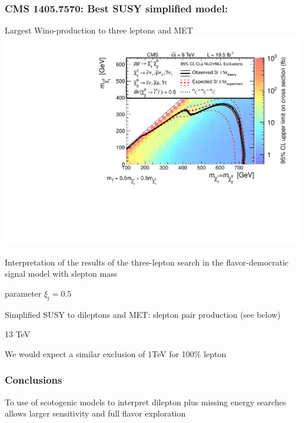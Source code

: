 \documentclass[%
xcolor=dvipsnames,table%
]{beamer}
\begin{document}
\begin{frame}
  \frametitle{CMS 1405.7570: Best SUSY simplified model:}
  Largest Wino-production to three leptons and MET
\centering
\includegraphics[scale=0.4,angle=-90]{exclusion_TChiSlepSnu_2i_0_5}

\begin{tiny}
Interpretation of the results of the three-lepton search in the flavor-democratic signal
model with slepton mass\\

\vspace{-0.3cm}

 parameter $\xi_{\tilde{l}}=0.5$
\end{tiny}

\vspace{-0.3cm}

Simplified SUSY to dileptons and MET: slepton pair production (see below) 

13 TeV

We would expect a similar exclusion of 1TeV for 100\% lepton
\end{frame}

\begin{frame}
  \frametitle{Conclusions}
  To use of scotogenic models to interpret dilepton
plus missing energy searches allows larger sensitivity and 
full flavor exploration
\end{frame}
\end{document}
